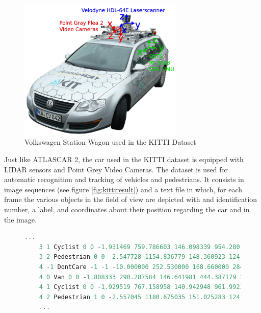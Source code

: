 \begin{figure}[htp]
	
	\centering
	\includegraphics[width=0.7\textwidth]{capstate/imgs/kitticar}
	
	\caption{Volkswagen Station Wagon used in the KITTI Dataset}
	\label{fig:kitticar}
	
\end{figure}

Just like ATLASCAR 2, the car used in the KITTI dataset is equipped with LIDAR sensors and Point Grey Video Cameras. The dataset is used for automatic recognition and tracking of vehicles and pedestrians. It consists in image sequences (see figure \ref{fig:kittiresult}) and a text file in which, for each frame the various objects in the field of view are depicted with and identification number, a label, and coordinates about their position regarding the car and in the image. \cite{Geiger} 

\begin{figure}
\begin{center}
	\begin{lstlisting}[caption={KITTI dataset file snippet.}, language=c++, label={lst: pop_grid}]
	...
	3 1 Cyclist 0 0 -1.931469 759.786603 146.098339 954.280160 374.000000 1.739063 0.824591 1.785241 1.821119 1.569936 5.783265 -1.642450
	3 2 Pedestrian 0 0 -2.547728 1154.836779 148.360923 1241.000000 321.627088 1.714062 0.767881 0.972283 6.463579 1.474131 7.560739 -1.860031
	4 -1 DontCare -1 -1 -10.000000 252.530000 168.660000 284.460000 202.850000 -1000.000000 -1000.000000 -1000.000000 -10.000000 -1.000000 -1.000000 -1.000000
	4 0 Van 0 0 -1.808333 290.287584 146.641981 444.387179 269.473545 2.000000 1.823255 4.433886 -4.934786 1.601945 14.098646 -2.139796
	4 1 Cyclist 0 0 -1.929519 767.158958 140.942948 961.992360 374.000000 1.739063 0.824591 1.785241 1.881359 1.534695 5.785600 -1.631447
	4 2 Pedestrian 1 0 -2.557045 1180.675035 151.025283 1241.000000 325.015204 1.714062 0.767881 0.972283 6.516488 1.497786 7.267796 -1.846627
	...	\end{lstlisting}
\end{center}
\end{figure}

